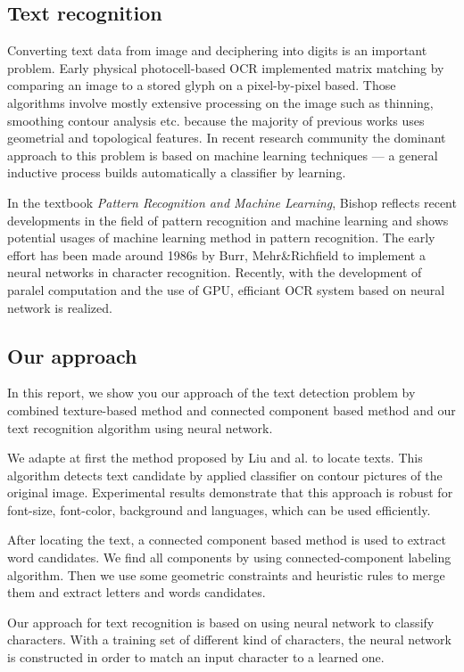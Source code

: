 \documentclass[paper=a4, french, 11pt]{scrartcl}
\begin{document}
\subsection{Text recognition}
Converting text data from image and deciphering into digits is an important problem. Early physical photocell-based OCR implemented matrix matching by comparing an image to a stored glyph on a pixel-by-pixel based. Those algorithms involve mostly extensive processing on the image such as thinning, smoothing contour analysis etc. because the majority of previous works uses geometrial and topological features. In recent research community the dominant approach to this problem is based on machine learning techniques --- a general inductive process builds automatically a classifier by learning.

In the textbook \textit{Pattern Recognition and Machine Learning}, Bishop reflects recent developments in the field of pattern recognition and machine learning and shows potential usages of machine learning method in pattern recognition. The early effort has been made around 1986s by Burr, Mehr\&Richfield to implement a neural networks in character recognition. Recently, with the development of paralel computation and the use of GPU, efficiant OCR system based on neural network is realized. 

\subsection{Our approach}
In this report, we show you our approach of the text detection problem by combined texture-based method and connected component based method and our text recognition algorithm using neural network. 

We adapte at first the method proposed by Liu and al. to locate texts. This algorithm detects text candidate by applied classifier on contour pictures of the original image. Experimental results demonstrate that this approach is robust for font-size, font-color, background and languages, which can be used efficiently.

After locating the text, a connected component based method is used to extract word candidates. We find all components by using connected-component labeling algorithm. Then we use some geometric constraints and heuristic rules to merge them and extract letters and words candidates.  

Our approach for text recognition is based on using neural network to classify characters. With a training set of different kind of characters, the neural network is constructed in order to match an input character to a learned one. 
\end{document}
